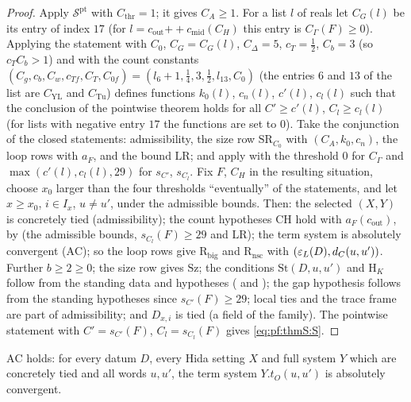\begin{proof}
Apply $\mathcal{S}^{\mathrm{pt}}$ with $C_{\mathrm{thr}}=1$; it gives $C_A\ge1$. For a list $l$ of reals let
$C_G(l)$ be its entry of index $17$ (for $l=c_{\mathrm{out}}\mathbin{+\!\!+}c_{\mathrm{mid}}(C_H)$ this entry is
$C_\Gamma(F)\ge0$). Applying the statement with $C_0$, $C_G=C_G(l)$, $C_\Delta=5$, $c_T=\frac12$, $C_b=3$ (so
$c_TC_b>1$) and with the count constants $(C_g,c_b,C_w,c_{Tf},C_T,C_{0f})=(l_6+1,\frac14,3,\frac12,l_{13},C_0)$ (the
entries $6$ and $13$ of the list are $C_{\mathrm{YL}}$ and $C_{\mathrm{Tu}}$) defines functions $k_0(l)$, $c_n(l)$,
$c'(l)$, $c_l(l)$ such that the conclusion of the pointwise theorem holds for all $C'\ge c'(l)$, $C_l\ge c_l(l)$
(for lists with negative entry $17$ the functions are set to $0$). Take the conjunction of the closed statements:
admissibility, the size row $\mathrm{SR}_{C_0}$ with $(C_A,k_0,c_n)$, the loop rows with $a_F$, and the bound
$\mathrm{LR}$; and apply  with the threshold $0$ for $C_\Gamma$ and
$\max(c'(l),c_l(l),29)$ for $s_{C'}$, $s_{C_l}$. Fix $F$, $C_H$ in the resulting situation, choose $x_0$ larger than
the four thresholds ``eventually'' of the statements, and let $x\ge x_0$, $i\in I_x$, $u\ne u'$, under the admissible
bounds. Then: the selected $(X,Y)$ is concretely tied (admissibility); the count hypotheses
$\mathrm{CH}$ hold with $a_F(c_{\mathrm{out}})$, by 
(the admissible bounds, $s_{C_l}(F)\ge29$ and $\mathrm{LR}$); the term system is absolutely convergent
($\mathrm{AC}$); so the loop rows give $\mathrm{R}_{\mathrm{big}}$ and $\mathrm{R}_{\mathrm{nsc}}$ with
$(\varepsilon_{L}(D),d_{C}(u,u'))$. Further $b\ge2\ge0$; the size row gives $\mathrm{Sz}$; the conditions
$\mathrm{St}(D,u,u')$ and $\mathrm{H}_{K}$ follow from the standing data and hypotheses
( and ); the gap
hypothesis follows from the standing hypotheses since $s_{C'}(F)\ge29$; local ties and the trace frame are part of
admissibility; and $D_{x,i}$ is tied (a field of the family). The pointwise statement with $C'=s_{C'}(F)$,
$C_l=s_{C_l}(F)$ gives \eqref{eq:pf:thmS:S}.
\end{proof}

\begin{lemma}\label{pf:thmS:absconv}
$\mathrm{AC}$ holds: for every datum $D$, every Hida setting $X$ and full system $Y$ which are concretely tied
and all words $u,u'$, the term system $Y.t_O(u,u')$ is absolutely convergent.
\end{lemma}

